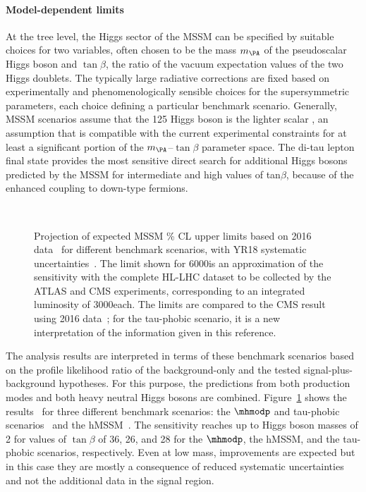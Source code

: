 \paragraph{Model-dependent limits}
\label{sec:model_dep}
%
At the tree level, the Higgs sector of the MSSM can be specified by suitable choices for two variables, 
often chosen to be the mass $m_{\PA}$ of the pseudoscalar Higgs boson
and $\tan\beta$, the ratio of the \mbox{vacuum} expectation
values of the two Higgs doublets.
The typically large radiative corrections are 
fixed based on experimentally and phenomenologically sensible choices for
the supersymmetric parameters, each choice defining a particular benchmark scenario.
Generally, MSSM scenarios assume that the 125 \UGeV Higgs boson is the lighter scalar \Ph, 
an assumption that is compatible with the current experimental constraints 
for at least a significant portion of the $m_{\PA}$--$\tan\beta$ parameter space.
The di-tau lepton final state provides the most sensitive direct search for additional
Higgs bosons predicted by the MSSM for intermediate and high values of tan$\beta$, 
because of the enhanced
coupling to down-type fermions.
%
\begin{figure}[htbp]
\begin{center}
\\
\end{center}
\caption{Projection of expected MSSM \% CL upper limits based on 2016 data~\cite{HIG-17-020} for different benchmark 
scenarios, with YR18 systematic uncertainties~\cite{CMS-PAS-FTR-18-017}. The limit shown for 6000\fbinv is an approximation of the sensitivity with 
the complete HL-LHC dataset to be collected by the ATLAS and CMS experiments, corresponding to an integrated luminosity of 3000\fbinv each. 
The limits are compared to the CMS result using 2016 data~\cite{HIG-17-020}; for the tau-phobic scenario, 
it is a new interpretation of the information given in this reference. 
}
\label{fig:model_mssm1}
\end{figure}

The analysis results are interpreted in terms of these benchmark scenarios based on the profile likelihood ratio of the 
background-only and the tested signal-plus-background hypotheses. 
For this purpose, the predictions from both production modes and both heavy neutral Higgs bosons are combined.
Figure~\ref{fig:model_mssm1} shows the results~\cite{HIG-17-020} 
for three different benchmark scenarios:
the $\mhmodp$ and tau-phobic scenarios~\cite{Carena:2013ytb} and the hMSSM~\cite{Djouadi:2013uqa,Bagnaschi:2015hka}.
The sensitivity reaches up to Higgs boson masses
of 2 \UTeV for values of $\tan \beta$ of 36, 26, and 28
for the $\mhmodp$, the hMSSM, and the tau-phobic scenarios,
respectively.
Even at low mass, improvements are expected but in this case they are mostly 
a consequence of reduced systematic uncertainties and not 
the additional data in the signal region.